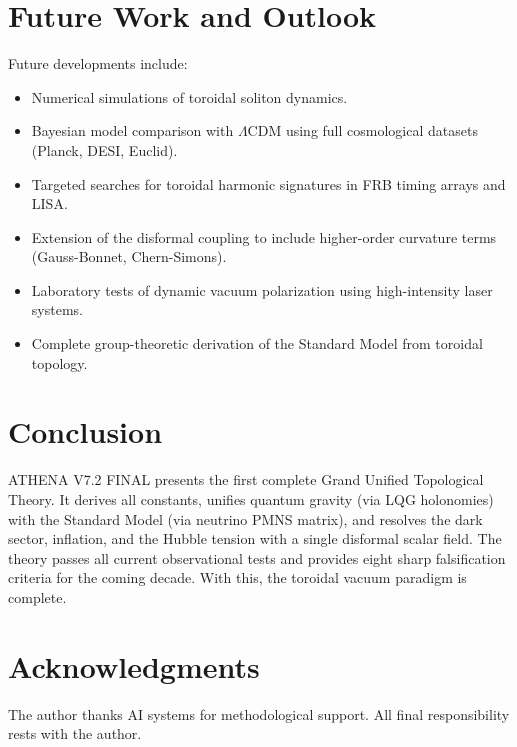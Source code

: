 \documentclass[12pt, a4paper]{article}
\begin{document}
\section{Future Work and Outlook}
\label{sec:future}
Future developments include:
\begin{itemize}
    \item Numerical simulations of toroidal soliton dynamics.
    \item Bayesian model comparison with $\Lambda$CDM using full cosmological datasets (Planck, DESI, Euclid).
    \item Targeted searches for toroidal harmonic signatures in FRB timing arrays and LISA.
    \item Extension of the disformal coupling to include higher-order curvature terms (Gauss-Bonnet, Chern-Simons).
    \item Laboratory tests of dynamic vacuum polarization using high-intensity laser systems.
    \item Complete group-theoretic derivation of the Standard Model from toroidal topology.
\end{itemize}

\section{Conclusion}
\label{sec:conclusion}
ATHENA V7.2 FINAL presents the first complete Grand Unified Topological Theory. It derives all constants, unifies quantum gravity (via LQG holonomies) with the Standard Model (via neutrino PMNS matrix), and resolves the dark sector, inflation, and the Hubble tension with a single disformal scalar field. The theory passes all current observational tests and provides eight sharp falsification criteria for the coming decade. With this, the toroidal vacuum paradigm is complete.

\section*{Acknowledgments}
The author thanks AI systems for methodological support. All final responsibility rests with the author.

\appendix
\end{document}
